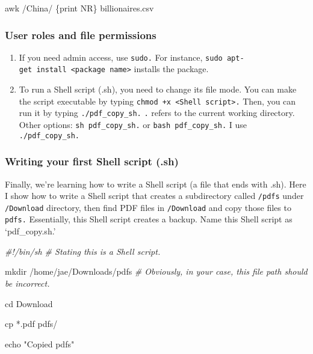 \documentclass[
]{book}
\newenvironment{Shaded}{\begin{snugshade}}{\end{snugshade}}
\newcommand{\BuiltInTok}[1]{#1}
\newcommand{\CommentTok}[1]{\textcolor[rgb]{0.56,0.35,0.01}{\textit{#1}}}
\newcommand{\FunctionTok}[1]{\textcolor[rgb]{0.00,0.00,0.00}{#1}}
\newcommand{\NormalTok}[1]{#1}
\newcommand{\StringTok}[1]{\textcolor[rgb]{0.31,0.60,0.02}{#1}}
\begin{document}
\begin{Shaded}
\begin{Highlighting}[]
\FunctionTok{awk} \StringTok{\textquotesingle{}/China/ \{print NR\}\textquotesingle{}}\NormalTok{ billionaires.csv }
\end{Highlighting}
\end{Shaded}

\hypertarget{user-roles-and-file-permissions}{%
\subsubsection{User roles and file permissions}\label{user-roles-and-file-permissions}}

\begin{enumerate}
\def\labelenumi{\arabic{enumi}.}
\item
  If you need admin access, use \texttt{sudo.} For instance, \texttt{sudo\ apt-get\ install\ \textless{}package\ name\textgreater{}} installs the package.
\item
  To run a Shell script (.sh), you need to change its file mode. You can make the script executable by typing \texttt{chmod\ +x\ \textless{}Shell\ script\textgreater{}.} Then, you can run it by typing \texttt{./pdf\_copy\_sh.} \texttt{.} refers to the current working directory. Other options: \texttt{sh\ pdf\_copy\_sh.} or \texttt{bash\ pdf\_copy\_sh.} I use \texttt{./pdf\_copy\_sh.}
\end{enumerate}

\hypertarget{writing-your-first-shell-script-.sh}{%
\subsubsection{Writing your first Shell script (.sh)}\label{writing-your-first-shell-script-.sh}}

Finally, we're learning how to write a Shell script (a file that ends with .sh). Here I show how to write a Shell script that creates a subdirectory called \texttt{/pdfs} under \texttt{/Download} directory, then find PDF files in \texttt{/Download} and copy those files to \texttt{pdfs.} Essentially, this Shell script creates a backup. Name this Shell script as `pdf\_copy.sh.'

\begin{Shaded}
\begin{Highlighting}[]

\CommentTok{\#!/bin/sh \# Stating this is a Shell script. }

\FunctionTok{mkdir}\NormalTok{ /home/jae/Downloads/pdfs }\CommentTok{\# Obviously, in your case, this file path should be incorrect.}

\BuiltInTok{cd}\NormalTok{ Download}

\FunctionTok{cp}\NormalTok{ *.pdf pdfs/ }

\BuiltInTok{echo} \StringTok{"Copied pdfs"}
\end{Highlighting}
\end{Shaded}
\end{document}
